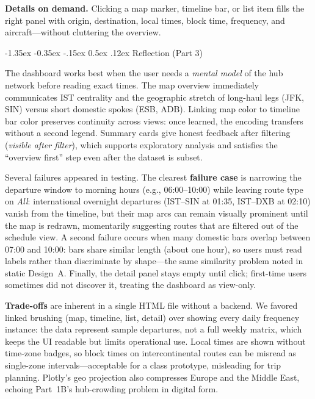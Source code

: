\documentclass[11pt]{article}
\makeatletter
\renewcommand\subsection{\@startsection{subsection}{2}{\z@}%
  {-1.35ex \@plus -0.35ex \@minus -.15ex}%
  {0.5ex \@plus .12ex}%
  {\normalfont\large\bfseries}}
\makeatother
\begin{document}
\textbf{Details on demand.} Clicking a map marker, timeline bar, or list item fills the right panel with origin, destination, local times, block time, frequency, and aircraft---without cluttering the overview.

\subsection{Reflection (Part 3)}

The dashboard works best when the user needs a \emph{mental model} of the hub network before reading exact times. The map overview immediately communicates IST centrality and the geographic stretch of long-haul legs (JFK, SIN) versus short domestic spokes (ESB, ADB). Linking map color to timeline bar color preserves continuity across views: once learned, the encoding transfers without a second legend. Summary cards give honest feedback after filtering (\emph{visible after filter}), which supports exploratory analysis and satisfies the ``overview first'' step even after the dataset is subset.

Several failures appeared in testing. The clearest \textbf{failure case} is narrowing the departure window to morning hours (e.g., 06:00--10:00) while leaving route type on \emph{All}: international overnight departures (IST--SIN at 01:35, IST--DXB at 02:10) vanish from the timeline, but their map arcs can remain visually prominent until the map is redrawn, momentarily suggesting routes that are filtered out of the schedule view. A second failure occurs when many domestic bars overlap between 07:00 and 10:00: bars share similar length (about one hour), so users must read labels rather than discriminate by shape---the same similarity problem noted in static Design~A. Finally, the detail panel stays empty until click; first-time users sometimes did not discover it, treating the dashboard as view-only.

\textbf{Trade-offs} are inherent in a single HTML file without a backend. We favored linked brushing (map, timeline, list, detail) over showing every daily frequency instance: the data represent sample departures, not a full weekly matrix, which keeps the UI readable but limits operational use. Local times are shown without time-zone badges, so block times on intercontinental routes can be misread as single-zone intervals---acceptable for a class prototype, misleading for trip planning. Plotly's geo projection also compresses Europe and the Middle East, echoing Part~1B's hub-crowding problem in digital form.
\end{document}

